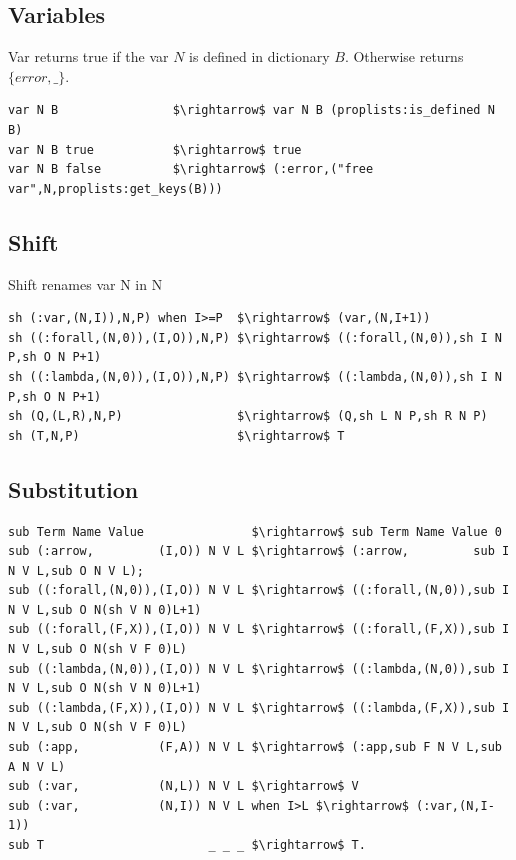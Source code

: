 \documentclass[11pt,oneside]{article}
\begin{document}
\subsection{Variables}
Var returns true if the var $N$ is defined in dictionary $B$. Otherwise returns $\{error,\_\}$.

\begin{lstlisting}[mathescape=true]
var N B                $\rightarrow$ var N B (proplists:is_defined N B)
var N B true           $\rightarrow$ true
var N B false          $\rightarrow$ (:error,("free var",N,proplists:get_keys(B)))
\end{lstlisting}

\subsection{Shift}
Shift renames var N in N

\begin{lstlisting}[mathescape=true]
sh (:var,(N,I)),N,P) when I>=P  $\rightarrow$ (var,(N,I+1))
sh ((:forall,(N,0)),(I,O)),N,P) $\rightarrow$ ((:forall,(N,0)),sh I N P,sh O N P+1)
sh ((:lambda,(N,0)),(I,O)),N,P) $\rightarrow$ ((:lambda,(N,0)),sh I N P,sh O N P+1)
sh (Q,(L,R),N,P)                $\rightarrow$ (Q,sh L N P,sh R N P)
sh (T,N,P)                      $\rightarrow$ T
\end{lstlisting}

\subsection{Substitution}

\begin{lstlisting}[mathescape=true]
sub Term Name Value               $\rightarrow$ sub Term Name Value 0
sub (:arrow,         (I,O)) N V L $\rightarrow$ (:arrow,         sub I N V L,sub O N V L);
sub ((:forall,(N,0)),(I,O)) N V L $\rightarrow$ ((:forall,(N,0)),sub I N V L,sub O N(sh V N 0)L+1)
sub ((:forall,(F,X)),(I,O)) N V L $\rightarrow$ ((:forall,(F,X)),sub I N V L,sub O N(sh V F 0)L)
sub ((:lambda,(N,0)),(I,O)) N V L $\rightarrow$ ((:lambda,(N,0)),sub I N V L,sub O N(sh V N 0)L+1)
sub ((:lambda,(F,X)),(I,O)) N V L $\rightarrow$ ((:lambda,(F,X)),sub I N V L,sub O N(sh V F 0)L)
sub (:app,           (F,A)) N V L $\rightarrow$ (:app,sub F N V L,sub A N V L)
sub (:var,           (N,L)) N V L $\rightarrow$ V
sub (:var,           (N,I)) N V L when I>L $\rightarrow$ (:var,(N,I-1))
sub T                       _ _ _ $\rightarrow$ T.
\end{lstlisting}
\end{document}
